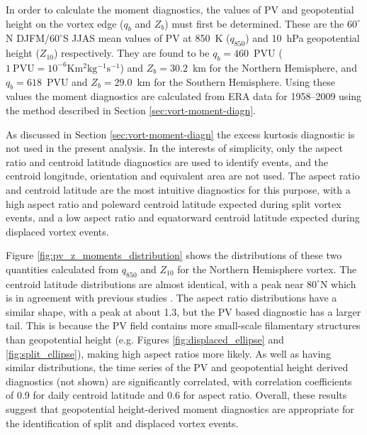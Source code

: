 In order to calculate the moment diagnostics, the values of PV and geopotential
height on the vortex edge ($q_b$ and $Z_b$) must first be determined. These are
the $60^{\circ}$N DJFM/$60^{\circ}$S JJAS mean values of PV at 850~K ($q_{850}$)
and 10~hPa geopotential height ($Z_{10}$) respectively. They are found to be
$q_b = 460$~PVU ($\mathrm{1~PVU = 10^{-6}Km^2kg^{-1}s^{-1}}$) and
$Z_b = 30.2$~km for the Northern Hemisphere, and $q_b = 618$~PVU and
$Z_b = 29.0$~km for the Southern Hemisphere. Using these values the moment
diagnostics are calculated from ERA data for 1958--2009 using the method
described in Section \ref{sec:vort-moment-diagn}.

As discussed in Section \ref{sec:vort-moment-diagn} the excess kurtosis
diagnostic is not used in the present analysis. In the interests of simplicity,
only the aspect ratio and centroid latitude diagnostics are used to identify
events, and the centroid longitude, orientation and equivalent area are not
used. The aspect ratio and centroid latitude are the most intuitive diagnostics
for this purpose, with a high aspect ratio and poleward centroid latitude
expected during split vortex events, and a low aspect ratio and equatorward
centroid latitude expected during displaced vortex events. 

Figure \ref{fig:pv_z_moments_distribution} shows the distributions of these two
quantities calculated from $q_{850}$ and $Z_{10}$ for the Northern Hemisphere
vortex. The centroid latitude distributions are almost identical, with a peak
near $80^{\circ}$N which is in agreement with previous studies
\citep{Mitchell2011,Waugh1999}. The aspect ratio distributions have a similar
shape, with a peak at about 1.3, but the PV based diagnostic has a larger
tail. This is because the PV field contains more small-scale filamentary
structures than geopotential height (e.g. Figures \ref{fig:displaced_ellipse}
and \ref{fig:split_ellipse}), making high aspect ratios more likely. As well as
having similar distributions, the time series of the PV and geopotential height
derived diagnostics (not shown) are significantly correlated, with correlation
coefficients of 0.9 for daily centroid latitude and 0.6 for aspect
ratio. Overall, these results suggest that geopotential height-derived moment
diagnostics are appropriate for the identification of split and displaced vortex
events.


